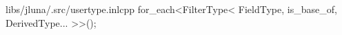 \begin{fileminted}{libs/jluna/.src/usertype.inl}{cpp}
for_each<FilterType<
    FieldType, is_base_of, DerivedType...
>>();
\end{fileminted}
                